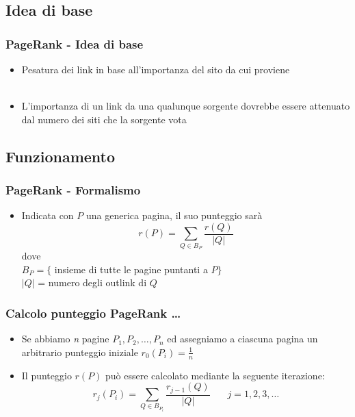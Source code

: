 \documentclass{beamer}
\begin{document}
\subsection{Idea di base}
\begin{frame}
	\frametitle{PageRank - Idea di base}
	\begin{itemize}
		\item Pesatura dei link in base all'importanza del sito da cui proviene\\~
		\item L'importanza di un link da una qualunque sorgente dovrebbe essere attenuato dal numero dei siti che la sorgente vota
	\end{itemize}
\end{frame}

\subsection{Funzionamento}
\begin{frame}
	\frametitle{PageRank - Formalismo}
	\begin{itemize}
		\item Indicata con $P$ una generica pagina, il suo punteggio sarà $$r(P)=\sum_{Q \in B_P}\frac{r(Q)}{|Q|}$$ dove \\ $B_P=\{$ insieme di tutte le pagine puntanti a $P\}$ \\ $|Q|$ = numero degli outlink di $Q$
	\end{itemize}
\end{frame}


\begin{frame}
	\frametitle{Calcolo punteggio PageRank \dots}
	\begin{itemize}
		\item Se abbiamo \emph{n} pagine $P_1,P_2,\dots,P_n$ ed assegniamo a ciascuna pagina un arbitrario punteggio iniziale $r_0(P_i)=\frac{1}{n}$
		\item Il punteggio $r(P)$ può essere calcolato mediante la seguente iterazione: $$r_j(P_i)= \sum_{Q \in B_{P_i}}\frac{r_{j-1}(Q)}{|Q|} ~~~~~~~~ j=1,2,3,\dots$$
	\end{itemize}
\end{frame}
\end{document}
